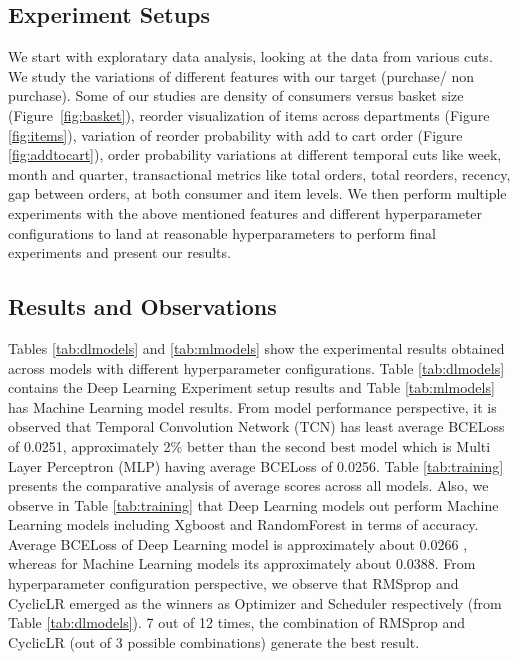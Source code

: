 \subsection{Experiment Setups}
We start with exploratary data analysis, looking at the data from various cuts. We
study the variations of different features with our target (purchase/ non purchase). Some of our studies are
density of consumers versus basket size (Figure~\ref{fig:basket}), reorder visualization of items 
across departments (Figure \ref{fig:items}), variation of reorder probability with add to cart order (Figure \ref{fig:addtocart}),
order probability variations at different temporal cuts like week, month and quarter, transactional metrics 
like total orders, total reorders, recency, gap between orders, at both consumer and item levels.
We then perform multiple experiments with the above mentioned features and different hyperparameter configurations to land at reasonable 
hyperparameters to perform final experiments and present our results.

\subsection{Results and Observations}
Tables \ref{tab:dlmodels} and \ref{tab:mlmodels} show the experimental results obtained across models with different 
hyperparameter configurations. Table \ref{tab:dlmodels} contains the Deep Learning Experiment setup results
and Table \ref{tab:mlmodels} has Machine Learning model results. From model performance perspective, it is observed that 
Temporal Convolution Network (TCN) has least average BCELoss of 0.0251, approximately 2\% better than the second best model
which is Multi Layer Perceptron (MLP) having average BCELoss of 0.0256. Table \ref{tab:training} presents
the comparative analysis of average scores across all models. Also, we observe in Table \ref{tab:training} 
that Deep Learning models out perform Machine Learning models including Xgboost and RandomForest in terms of accuracy.
Average BCELoss of Deep Learning model is approximately about 0.0266 , whereas for Machine Learning models its 
approximately about 0.0388. From hyperparameter configuration perspective, we observe that RMSprop and CyclicLR emerged as the 
winners as Optimizer and Scheduler respectively (from Table \ref{tab:dlmodels}). 7 out of 12 times, the 
combination of RMSprop and CyclicLR (out of 3 possible combinations) generate the best result.

